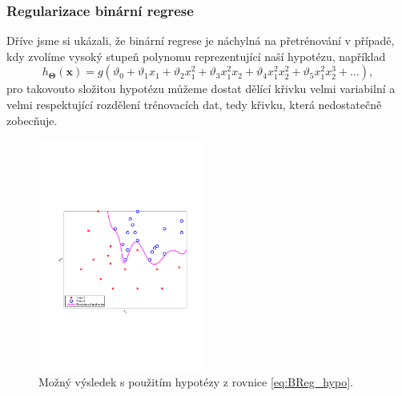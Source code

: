 \subsubsection*{Regularizace binární regrese}

\par{Dříve jsme si ukázali, že binární regrese je náchylná na přetrénování v případě, kdy zvolíme vysoký stupeň polynomu reprezentující naší hypotézu, například
\begin{equation}
	h_{\bm{\Theta}} \left( \bm{x} \right) = g \left( \vartheta_0  + \vartheta_1 x_1 + \vartheta_2 x^2_1 + \vartheta_3 x_1^2 x_2 + \vartheta_4 x_1^2 x_2^2 + \vartheta_5 x_1^2 x_2^3 + \ldots \right),
	\label{eq:BReg_hypo}
\end{equation}
pro takovouto složitou hypotézu můžeme dostat dělící křivku velmi variabilní a velmi respektující rozdělení trénovacích dat, tedy křivku, která nedostatečně zobecňuje.
\begin{figure}[!ht]
	\centering
	\includegraphics[width = 0.48\textwidth, trim = 2.5cm 7cm 2cm 9cm]{./Img/Regularizace/binarniRegrese/regularizace_binarni_regrese.pdf}
	\caption{Možný výsledek s použitím hypotézy z rovnice \ref{eq:BReg_hypo}.}
	\label{fig:binaryRegularizationExample}
\end{figure}
}

